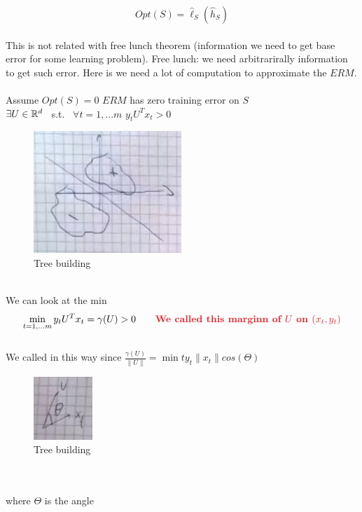 \documentclass[../main.tex]{subfiles}
\begin{document}
$$
Opt(S) = \hat{\ell}_S(\hat{h}_S)
$$
\\
This is not related with free lunch theorem (information we need to get base error for some learning problem). Free lunch: we need arbitrarirally information to get such error.
Here is we need a lot of computation to approximate the $ERM$. 
\\\\
Assume $Opt(S) = 0 $ $ERM$ has zero training error on $S$\\
$\exists U \in \mathbb{R}^d$ \ s.t. \ $\forall t = 1 , ...m$ \qquad $y_tU^Tx_t > 0$ \qquad {}\\
\begin{figure}[h]
    \centering
    \includegraphics[width=0.6\linewidth]{../img/lez13-img1.JPG}
    \caption{Tree building}
\end{figure}
\\
We can look at the min
$$
\min_{t=1,...m} y_t U^T x_t = \gamma(U) > 0 \qquad \bred{We called this marginn of $U$ on $(x_t,y_t)$}
$$ 
\\
We called in this way since $\frac{\gamma(U)}{\| U \|} = \min{t} y_t \| x_t\| cos(\Theta)
$
\begin{figure}[h]
    \centering
    \includegraphics[width=0.2\linewidth]{../img/lez13-img2.JPG}
    \caption{Tree building}
\end{figure}\\
\\
where $\Theta$ is the angle
\\
\end{document}
